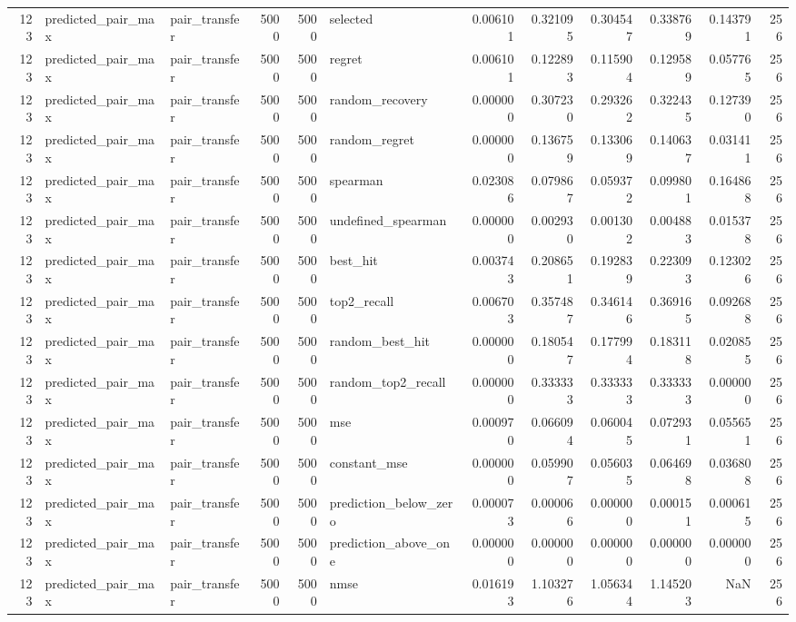 \begin{tabular}{rllrrlrrrrrr}
123 & predicted_pair_max & pair_transfer & 5000 & 5000 & selected & 0.006101 & 0.321095 & 0.304547 & 0.338769 & 0.143791 & 256 \\
123 & predicted_pair_max & pair_transfer & 5000 & 5000 & regret & 0.006101 & 0.122893 & 0.115904 & 0.129589 & 0.057765 & 256 \\
123 & predicted_pair_max & pair_transfer & 5000 & 5000 & random_recovery & 0.000000 & 0.307230 & 0.293262 & 0.322435 & 0.127390 & 256 \\
123 & predicted_pair_max & pair_transfer & 5000 & 5000 & random_regret & 0.000000 & 0.136759 & 0.133069 & 0.140637 & 0.031411 & 256 \\
123 & predicted_pair_max & pair_transfer & 5000 & 5000 & spearman & 0.023086 & 0.079867 & 0.059372 & 0.099801 & 0.164868 & 256 \\
123 & predicted_pair_max & pair_transfer & 5000 & 5000 & undefined_spearman & 0.000000 & 0.002930 & 0.001302 & 0.004883 & 0.015378 & 256 \\
123 & predicted_pair_max & pair_transfer & 5000 & 5000 & best_hit & 0.003743 & 0.208651 & 0.192839 & 0.223093 & 0.123026 & 256 \\
123 & predicted_pair_max & pair_transfer & 5000 & 5000 & top2_recall & 0.006703 & 0.357487 & 0.346146 & 0.369165 & 0.092688 & 256 \\
123 & predicted_pair_max & pair_transfer & 5000 & 5000 & random_best_hit & 0.000000 & 0.180547 & 0.177994 & 0.183118 & 0.020855 & 256 \\
123 & predicted_pair_max & pair_transfer & 5000 & 5000 & random_top2_recall & 0.000000 & 0.333333 & 0.333333 & 0.333333 & 0.000000 & 256 \\
123 & predicted_pair_max & pair_transfer & 5000 & 5000 & mse & 0.000970 & 0.066094 & 0.060045 & 0.072931 & 0.055651 & 256 \\
123 & predicted_pair_max & pair_transfer & 5000 & 5000 & constant_mse & 0.000000 & 0.059907 & 0.056035 & 0.064698 & 0.036808 & 256 \\
123 & predicted_pair_max & pair_transfer & 5000 & 5000 & prediction_below_zero & 0.000073 & 0.000066 & 0.000000 & 0.000151 & 0.000615 & 256 \\
123 & predicted_pair_max & pair_transfer & 5000 & 5000 & prediction_above_one & 0.000000 & 0.000000 & 0.000000 & 0.000000 & 0.000000 & 256 \\
123 & predicted_pair_max & pair_transfer & 5000 & 5000 & nmse & 0.016193 & 1.103276 & 1.056344 & 1.145203 & NaN & 256 \\

\end{tabular}
